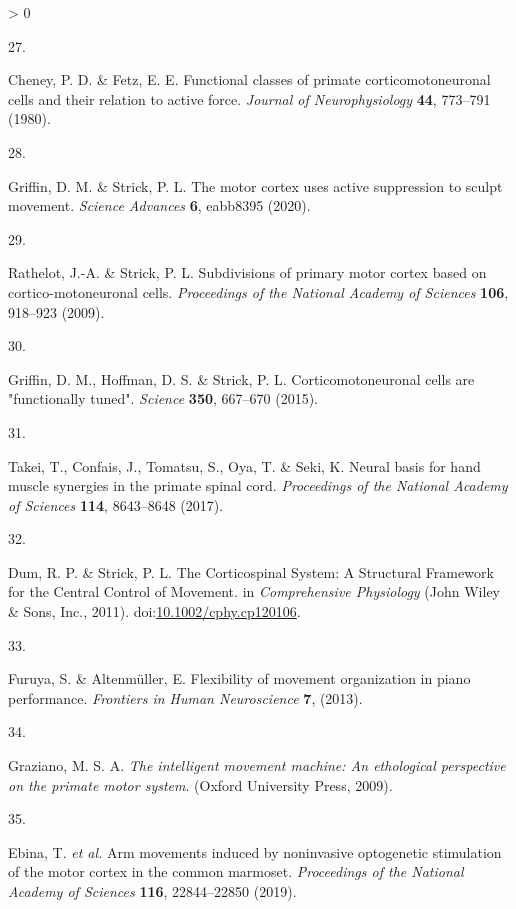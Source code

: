 \documentclass[
  a4paper,
]{article}
\newlength{\cslhangindent}
\newlength{\csllabelwidth}
\newenvironment{CSLReferences}[2] %
 {%
  \setlength{\parindent}{0pt}
  \ifodd #1 \everypar{\setlength{\hangindent}{\cslhangindent}}\ignorespaces\fi
  \ifnum #2 > 0
  \setlength{\parskip}{#2\baselineskip}
  \fi
 }%
 {}
\newcommand{\CSLLeftMargin}[1]{\parbox[t]{\csllabelwidth}{#1}}
\newcommand{\CSLRightInline}[1]{\parbox[t]{\linewidth - \csllabelwidth}{#1}\break}
\begin{document}
\begin{CSLReferences}{0}{0}
\leavevmode\hypertarget{ref-cheneyFunctionalClassesPrimate1980}{}%
\CSLLeftMargin{27. }
\CSLRightInline{Cheney, P. D. \& Fetz, E. E. Functional classes of
primate corticomotoneuronal cells and their relation to active force.
\emph{Journal of Neurophysiology} \textbf{44}, 773--791 (1980).}

\leavevmode\hypertarget{ref-griffinMotorCortexUses2020}{}%
\CSLLeftMargin{28. }
\CSLRightInline{Griffin, D. M. \& Strick, P. L. The motor cortex uses
active suppression to sculpt movement. \emph{Science Advances}
\textbf{6}, eabb8395 (2020).}

\leavevmode\hypertarget{ref-Rathelot2009}{}%
\CSLLeftMargin{29. }
\CSLRightInline{Rathelot, J.-A. \& Strick, P. L. Subdivisions of primary
motor cortex based on cortico-motoneuronal cells. \emph{Proceedings of
the National Academy of Sciences} \textbf{106}, 918--923 (2009).}

\leavevmode\hypertarget{ref-griffinCorticomotoneuronalCellsAre2015}{}%
\CSLLeftMargin{30. }
\CSLRightInline{Griffin, D. M., Hoffman, D. S. \& Strick, P. L.
Corticomotoneuronal cells are "functionally tuned". \emph{Science}
\textbf{350}, 667--670 (2015).}

\leavevmode\hypertarget{ref-Takei2017}{}%
\CSLLeftMargin{31. }
\CSLRightInline{Takei, T., Confais, J., Tomatsu, S., Oya, T. \& Seki, K.
Neural basis for hand muscle synergies in the primate spinal cord.
\emph{Proceedings of the National Academy of Sciences} \textbf{114},
8643--8648 (2017).}

\leavevmode\hypertarget{ref-dumCorticospinalSystemStructural2011}{}%
\CSLLeftMargin{32. }
\CSLRightInline{Dum, R. P. \& Strick, P. L. The {Corticospinal System}:
{A Structural Framework} for the {Central Control} of {Movement}. in
\emph{Comprehensive {Physiology}} ({John Wiley \& Sons, Inc.}, 2011).
doi:\href{https://doi.org/10.1002/cphy.cp120106}{10.1002/cphy.cp120106}.}

\leavevmode\hypertarget{ref-furuyaFlexibilityMovementOrganization2013}{}%
\CSLLeftMargin{33. }
\CSLRightInline{Furuya, S. \& Altenmüller, E. Flexibility of movement
organization in piano performance. \emph{Frontiers in Human
Neuroscience} \textbf{7}, (2013).}

\leavevmode\hypertarget{ref-grazianoIntelligentMovementMachine2009}{}%
\CSLLeftMargin{34. }
\CSLRightInline{Graziano, M. S. A. \emph{The intelligent movement
machine: An ethological perspective on the primate motor system}.
({Oxford University Press}, 2009).}

\leavevmode\hypertarget{ref-ebina2019}{}%
\CSLLeftMargin{35. }
\CSLRightInline{Ebina, T. \emph{et al.} Arm movements induced by
noninvasive optogenetic stimulation of the motor cortex in the common
marmoset. \emph{Proceedings of the National Academy of Sciences}
\textbf{116}, 22844--22850 (2019).}


\end{CSLReferences}
\end{document}

